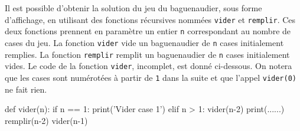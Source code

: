 Il est possible d'obtenir la solution du jeu du baguenaudier, sous forme d'affichage, en utilisant des fonctions récursives nommées \texttt{vider} et \texttt{remplir}. Ces deux fonctions prennent en paramètre un entier \texttt{n} correspondant au nombre de cases du jeu. La fonction \texttt{vider} vide un baguenaudier de \texttt{n} cases initialement remplies. La fonction \texttt{remplir} remplit un baguenaudier de \texttt{n} cases initialement vides. 
Le code de la fonction \texttt{vider}, incomplet, est donné ci-dessous. On notera que les cases sont numérotées à partir de \texttt{1} dans la suite et que l'appel \texttt{vider(0)} ne fait rien.
\begin{CodePythontexAlt}[TaillePolice=\large, Largeur=1\linewidth,Centre,Lignes=true,PremLigne=1]{}
    def vider(n):
        if n == 1:
            print('Vider case 1')
        elif n > 1:
            vider(n-2)
            print(......)
            remplir(n-2)
            vider(n-1)
\end{CodePythontexAlt}


